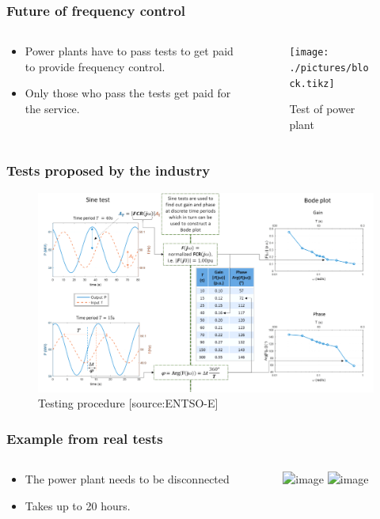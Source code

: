 \begin{frame}
	\frametitle{Future of frequency control}
	\begin{columns}
		\begin{column}{0.4\textwidth}
			\begin{itemize}
				\item Power plants have to pass tests to get paid to provide frequency control.
				\item Only those who pass the tests get paid for the service.
			\end{itemize}
		\end{column}
	\begin{column}{0.6\textwidth}
		\begin{figure}
			\texttt{[image: ./pictures/block.tikz]}
			\caption{Test of power plant}
		\end{figure}
	\end{column}
\end{columns}
\end{frame}
\begin{frame}
	\frametitle{Tests proposed by the industry}
	\begin{figure}
		\includegraphics[width=\textwidth]{./pictures/tests.png}
		\caption{Testing procedure [source:ENTSO-E]}
	\end{figure}
\end{frame}
\begin{frame}
	\frametitle{Example from real tests}
	\begin{columns}
		\begin{column}{0.5\textwidth}
			\begin{itemize}
				\item<1-> The power plant needs to be disconnected
				\item<2-> Takes up to 20 hours.
			\end{itemize}
		\end{column}
		\begin{column}{0.5\textwidth}
			\begin{figure}
			\includegraphics<1->[width=\textwidth]{./pictures/aura_signals.tikz}
						\includegraphics<1>[width=\textwidth]{./pictures/frd.tikz}
				\end{figure}
				\end{column}
		\end{columns}
\end{frame}
